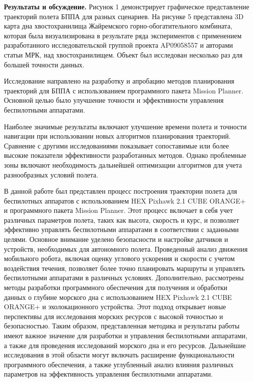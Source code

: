 \begin{multicols}{2}
{\bfseries Результаты и обсуждение.} Рисунок 1 демонстрирует графическое
представление траекторий полета БППА для разных сценариев. На рисунке 5
представлена 3D карта дна хвостохранилища Жайремского
горно-обогатительного комбината, которая была визуализирована в
результате ряда экспериментов с применением разработанного
исследовательской группой проекта AP09058557 и авторами статьи МРК, над
хвостохранилищем. Объект был исследован несколько раз для большей
точности данных.

Исследование направлено на разработку и апробацию методов планирования
траекторий для БППА с использованием программного пакета Mission
Planner. Основной целью было улучшение точности и эффективности
управления беспилотными аппаратами.

Наиболее значимые результаты включают улучшение времени полета и
точности навигации при использовании новых алгоритмов планирования
траекторий. Сравнение с другими исследованиями показывает сопоставимые
или более высокие показатели эффективности разработанных методов. Однако
проблемные зоны включают необходимость дальнейшей оптимизации алгоритмов
для учета разнообразных условий полета.

В данной работе был представлен процесс построения траектории полета для
беспилотных аппаратов с использованием HEX Pixhawk 2.1 CUBE ORANGE+ и
программного пакета Mission Planner. Этот процесс включает в себя учет
различных параметров полета, таких как высота, скорость и курс, и
позволяет эффективно управлять беспилотными аппаратами в соответствии с
заданными целями. Основное внимание уделено безопасности и настройке
датчиков и устройств, необходимых для автономного полета. Проведенный
анализ движения мобильного робота, включая оценку углового ускорения и
скорости с учетом воздействия течения, позволяет более точно планировать
маршруты и управлять беспилотными аппаратами в различных условиях.
Дополнительно, рассмотрены методы разработки программного обеспечения
для получения и обработки данных о глубине морского дна с использованием
HEX Pixhawk 2.1 CUBE ORANGE+ и эхолокационного устройства. Этот подход
открывает новые перспективы для исследования морских ресурсов с высокой
точностью и безопасностью. Таким образом, представленная методика и
результаты работы имеют важное значение для разработки и управления
беспилотными аппаратами, а также для проведения исследований морского
дна и его ресурсов. Дальнейшие исследования в этой области могут
включать расширение функциональности программного обеспечения, а также
углубленный анализ влияния различных параметров на эффективность
управления беспилотными аппаратами.


\end{multicols}
